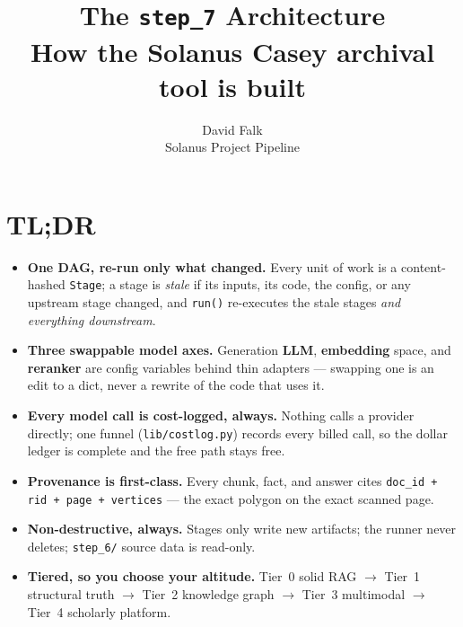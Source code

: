 \documentclass[11pt]{article}
\title{\bfseries The \texttt{step\_7} Architecture\\[2pt]
\large How the Solanus Casey archival tool is built}
\author{David Falk \\ Solanus Project Pipeline}
\date{}
\newcommand{\code}[1]{\texttt{#1}}
\begin{document}
\maketitle
\tableofcontents
\bigskip

\section{TL;DR}

\begin{tldr}
\begin{itemize}[leftmargin=1.2em, itemsep=3pt]
  \item \textbf{One DAG, re-run only what changed.} Every unit of work is a content-hashed
        \code{Stage}; a stage is \emph{stale} if its inputs, its code, the config, or any upstream
        stage changed, and \code{run()} re-executes the stale stages \emph{and everything
        downstream}.
  \item \textbf{Three swappable model axes.} Generation \textbf{LLM}, \textbf{embedding} space, and
        \textbf{reranker} are config variables behind thin adapters --- swapping one is an edit to a
        dict, never a rewrite of the code that uses it.
  \item \textbf{Every model call is cost-logged, always.} Nothing calls a provider directly; one
        funnel (\code{lib/costlog.py}) records every billed call, so the dollar ledger is complete
        and the free path stays free.
  \item \textbf{Provenance is first-class.} Every chunk, fact, and answer cites
        \code{doc\_id\,+\,rid\,+\,page\,+\,vertices} --- the exact polygon on the exact scanned page.
  \item \textbf{Non-destructive, always.} Stages only write new artifacts; the runner never deletes;
        \code{step\_6/} source data is read-only.
  \item \textbf{Tiered, so you choose your altitude.} Tier~0 solid RAG $\rightarrow$ Tier~1
        structural truth $\rightarrow$ Tier~2 knowledge graph $\rightarrow$ Tier~3 multimodal
        $\rightarrow$ Tier~4 scholarly platform.
\end{itemize}
\end{tldr}

\end{document}
